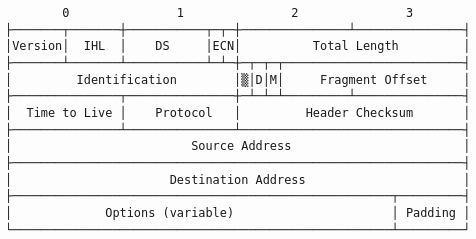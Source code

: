 \documentclass[varwidth=25cm,crop]{standalone}
\begin{document}
\begin{verbatim}
        0               1               2               3
├───────┬───────┼───────────┬─┬─┼───────────────┴───────────────┤
│Version│  IHL  │    DS     │ECN│          Total Length         │
├───────┴───────┴───────────┴─┴─┼─┬─┬─┬─────────────────────────┤
│         Identification        │▒│D│M│     Fragment Offset     │
├───────────────┬───────────────┼─┴─┴─┴─────────┴───────────────┤
│  Time to Live │    Protocol   │         Header Checksum       │
├───────────────┴───────────────┴───────────────────────────────┤
│                         Source Address                        │
├───────────────────────────────────────────────────────────────┤
│                      Destination Address                      │
├─────────────────────────────────────────────────────┬─────────┤
│             Options (variable)                      │ Padding │
└─────────────────────────────────────────────────────┴─────────┘
\end{verbatim}
\end{document}
